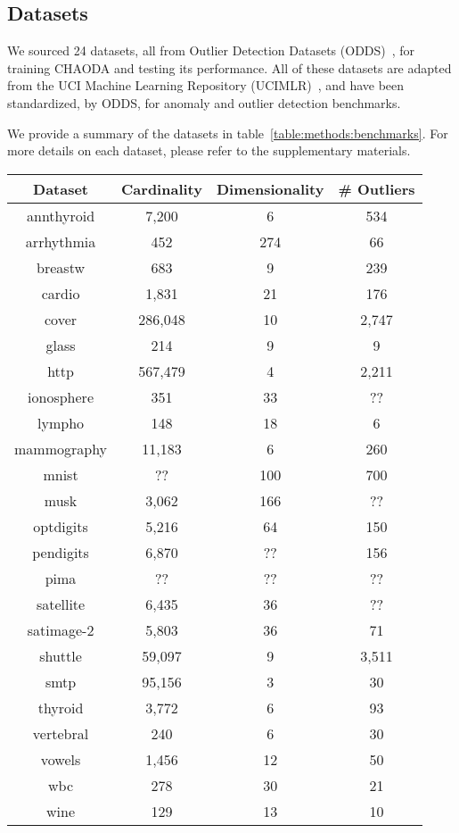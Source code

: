 

\subsection{Datasets}\label{subsec:methods:datasets}

We sourced 24 datasets, all from Outlier Detection Datasets (ODDS)~\cite{rayana2016odds}, for training CHAODA and testing its performance.
All of these datasets are adapted from the UCI Machine Learning Repository (UCIMLR)~\cite{UCIMLR}, and have been standardized, by ODDS, for anomaly and outlier detection benchmarks.

We provide a summary of the datasets in table~\ref{table:methods:benchmarks}.
For more details on each dataset, please refer to the supplementary materials.

\begin{table*}[!t]
\renewcommand{\arraystretch}{1.25}
\caption{Datasets used for Benchmarks}
\label{table:methods:benchmarks}
\centering
\begin{tabular}{|c|c|c|c|}
\hline
\textbf{Dataset} & \textbf{Cardinality} & \textbf{Dimensionality} & \textbf{\# Outliers} \\
\hline
annthyroid & 7,200 & 6 & 534 \\
\hline
arrhythmia & 452 & 274 & 66 \\
\hline
breastw & 683 & 9 & 239 \\
\hline
cardio & 1,831 & 21 & 176 \\
\hline
cover & 286,048 & 10 & 2,747 \\
\hline
glass & 214 & 9 & 9 \\
\hline
http & 567,479 & 4 & 2,211 \\
\hline
ionosphere & 351 & 33 & ?? \\
\hline
lympho & 148 & 18 & 6 \\
\hline
mammography & 11,183 & 6 & 260 \\
\hline
mnist & ?? & 100 & 700 \\
\hline
musk & 3,062 & 166 & ?? \\
\hline
optdigits & 5,216 & 64 & 150 \\
\hline
pendigits & 6,870 & ?? & 156 \\
\hline
pima & ?? & ?? & ?? \\
\hline
satellite & 6,435 & 36 & ?? \\
\hline
satimage-2 & 5,803 & 36 & 71 \\
\hline
shuttle & 59,097 & 9 & 3,511 \\
\hline
smtp & 95,156 & 3 & 30 \\
\hline
thyroid & 3,772 & 6 & 93 \\
\hline
vertebral & 240 & 6 & 30 \\
\hline
vowels & 1,456 & 12 & 50 \\
\hline
wbc & 278 & 30 & 21 \\
\hline
wine & 129 & 13 & 10 \\
\hline
\end{tabular}
\end{table*}

